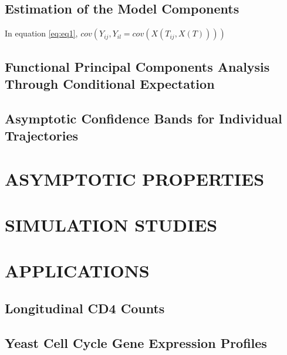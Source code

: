 \documentclass[11pt]{report}
\begin{document}
\subsection*{Estimation of the Model Components}
In equation \eqref{eq:eq1}, $cov(Y_{ij}, Y_{il} = cov(X(T_{ij}, X(T))))$

\subsection*{Functional Principal Components Analysis Through Conditional Expectation}

\subsection*{Asymptotic Confidence Bands for Individual Trajectories}

\section{ASYMPTOTIC PROPERTIES}

\section{SIMULATION STUDIES}

\section{APPLICATIONS}

\subsection*{Longitudinal CD4 Counts}

\subsection*{Yeast Cell Cycle Gene Expression Profiles}
\end{document}
